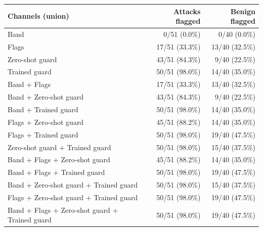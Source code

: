 \begin{tabular}{lrr}
\toprule
Channels (union) & Attacks flagged & Benign flagged \\
\midrule
Band & 0/51 (0.0\%) & 0/40 (0.0\%) \\
Flags & 17/51 (33.3\%) & 13/40 (32.5\%) \\
Zero-shot guard & 43/51 (84.3\%) & 9/40 (22.5\%) \\
Trained guard & 50/51 (98.0\%) & 14/40 (35.0\%) \\
Band + Flags & 17/51 (33.3\%) & 13/40 (32.5\%) \\
Band + Zero-shot guard & 43/51 (84.3\%) & 9/40 (22.5\%) \\
Band + Trained guard & 50/51 (98.0\%) & 14/40 (35.0\%) \\
Flags + Zero-shot guard & 45/51 (88.2\%) & 14/40 (35.0\%) \\
Flags + Trained guard & 50/51 (98.0\%) & 19/40 (47.5\%) \\
Zero-shot guard + Trained guard & 50/51 (98.0\%) & 15/40 (37.5\%) \\
Band + Flags + Zero-shot guard & 45/51 (88.2\%) & 14/40 (35.0\%) \\
Band + Flags + Trained guard & 50/51 (98.0\%) & 19/40 (47.5\%) \\
Band + Zero-shot guard + Trained guard & 50/51 (98.0\%) & 15/40 (37.5\%) \\
Flags + Zero-shot guard + Trained guard & 50/51 (98.0\%) & 19/40 (47.5\%) \\
Band + Flags + Zero-shot guard + Trained guard & 50/51 (98.0\%) & 19/40 (47.5\%) \\
\bottomrule
\end{tabular}
